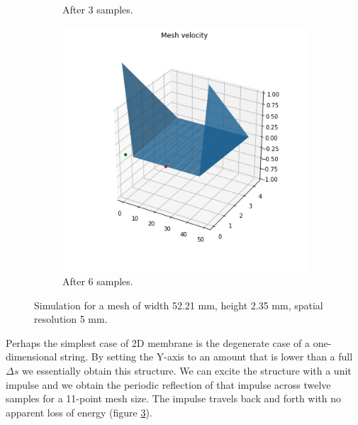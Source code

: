 \documentclass{article}
\begin{document}
\begin{figure}
\begin{subfigure}{.3\textwidth}
      \caption{After 3 samples.}
      \label{fig:1d-sample3}
    \end{subfigure}%
    \begin{subfigure}{.3\textwidth}
      \centering
      \includegraphics[width=1\linewidth]{fig/1d-sample6}
      \caption{After 6 samples.}
      \label{fig:1d-sample6}
    \end{subfigure}
    \caption{Simulation for a mesh of
    width 52.21 mm, height 2.35 mm, spatial resolution 5 mm.}
    \label{fig:1dcase}
\end{figure}

Perhaps the simplest case of 2D membrane is the degenerate
case of a one-dimensional string. By setting the Y-axis to an
amount that is lower than a full \(\Delta s\) we essentially
obtain this structure. We can excite the structure with a
unit impulse and we obtain the periodic reflection of that impulse
across twelve samples for a 11-point mesh size. The impulse
travels back and forth with no apparent loss of energy
(figure \ref{fig:1dcase}).
\end{document}
